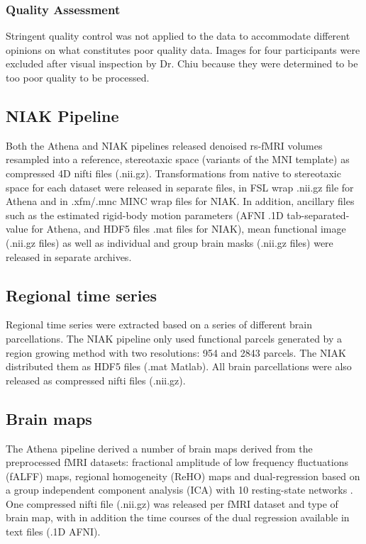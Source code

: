 \documentclass[preprint,12pt,3p]{elsarticle}
\begin{document}
\begin{itemize}
\subsubsection{Quality Assessment}
Stringent quality control was not applied to the data to accommodate different opinions on what constitutes poor quality data. Images for four participants were excluded after visual inspection by Dr. Chiu because they were determined to be too poor quality to be processed.

\subsection{NIAK Pipeline}

Both the Athena and NIAK pipelines released denoised rs-fMRI volumes resampled into a reference, stereotaxic space (variants of the MNI template) as compressed 4D nifti files (.nii.gz). Transformations from native to stereotaxic space for each dataset were released in separate files, in FSL wrap .nii.gz file for Athena and in .xfm/.mnc MINC wrap files for NIAK. In addition, ancillary files such as the estimated rigid-body motion parameters (AFNI .1D tab-separated-value for Athena, and HDF5 files .mat files for NIAK), mean functional image (.nii.gz files) as well as individual and group brain masks (.nii.gz files) were released in separate archives. 

\subsection{Regional time series} Regional time series were extracted based on a series of different brain parcellations. The NIAK pipeline only used functional parcels generated by a region growing method \cite{bellec2006identification} with two resolutions: 954 and 2843 parcels. The  NIAK distributed them as HDF5 files (.mat Matlab). All brain parcellations were also released as compressed nifti files (.nii.gz). 

\subsection{Brain maps}
The Athena pipeline derived a number of brain maps derived from the preprocessed fMRI datasets: fractional amplitude of low frequency fluctuations (fALFF) maps, regional homogeneity (ReHO) maps and dual-regression based on a group independent component analysis (ICA) with 10 resting-state networks \citep{smith2009correspondence}. One compressed nifti file (.nii.gz) was released per fMRI dataset and type of brain map, with in addition the time courses of the dual regression available in text files (.1D AFNI).




\end{itemize}
\end{document}
